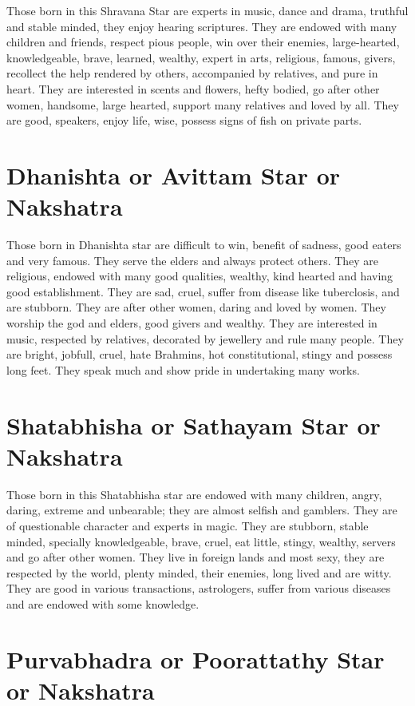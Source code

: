 \documentclass[12pt, right open]{memoir}
\begin{document}
Those born in this Shravana Star are experts in music, dance and drama, truthful and stable minded, they enjoy hearing scriptures. They are endowed with many children and friends, respect pious people, win over their enemies, large-hearted, knowledgeable, brave, learned, wealthy, expert in arts, religious, famous, givers, recollect the help rendered by others, accompanied by relatives, and pure in heart. They are interested in scents and flowers, hefty bodied, go after other women, handsome, large hearted, support many relatives and loved by all. They are good, speakers, enjoy life, wise, possess signs of fish on private parts.


\section{Dhanishta or Avittam Star or Nakshatra}

Those born in Dhanishta star are difficult to win, benefit of sadness, good eaters and very famous. They serve the elders and always protect others. They are religious, endowed with many good qualities, wealthy, kind hearted and having good establishment. They are sad, cruel, suffer from disease like tuberclosis, and are stubborn. They are after other women, daring and loved by women. They worship the god and elders, good givers and wealthy. They are interested in music, respected by relatives, decorated by jewellery and rule many people. They are bright, jobfull, cruel, hate Brahmins, hot constitutional, stingy and possess long feet. They speak much and show pride in undertaking many works.


\section{Shatabhisha or Sathayam Star or Nakshatra}

Those born in this Shatabhisha star are endowed with many children, angry, daring, extreme and unbearable; they are almost selfish and gamblers. They are of questionable character and experts in magic. They are stubborn, stable minded, specially knowledgeable, brave, cruel, eat little, stingy, wealthy, servers and go after other women. They live in foreign lands and most sexy, they are respected by the world, plenty minded, their enemies, long lived and are witty. They are good in various transactions, astrologers, suffer from various diseases and are endowed with some knowledge.


\section{Purvabhadra or Poorattathy Star or Nakshatra}
\end{document}
